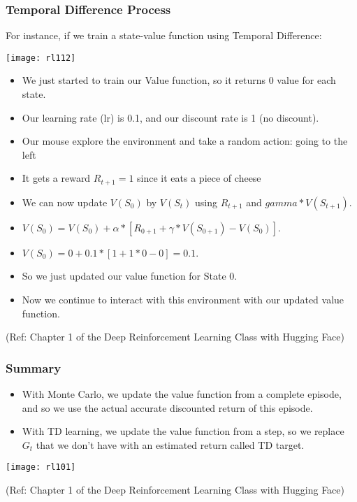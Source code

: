\begin{frame}[fragile]\frametitle{Temporal Difference Process}

For instance, if we train a state-value function using Temporal Difference:

\begin{center}
\texttt{[image: rl112]}
\end{center}


\begin{itemize}
\item We just started to train our Value function, so it returns 0 value for each state.
\item Our learning rate (lr) is 0.1, and our discount rate is 1 (no discount).
\item Our mouse explore the environment and take a random action: going to the left
\item It gets a reward $R_{t+1} = 1$ since it eats a piece of cheese
\item We can now update $V(S_0)$ by $V(S_t)$ using $R_{t+1}$ and $gamma * V(S_{t+1})$.
\item $V(S_0) = V(S_0) + \alpha * [R_{0+1} + \gamma * V(S_{0+1}) -V(S_0)] $.
\item $V(S_0) = 0 + 0.1 * [1 + 1 * 0 - 0] = 0.1$.
\item So we just updated our value function for State 0.
\item Now we continue to interact with this environment with our updated value function.
\end{itemize}


{\tiny (Ref: Chapter 1 of the Deep Reinforcement Learning Class with Hugging Face)}

\end{frame}



\begin{frame}[fragile]\frametitle{Summary}


\begin{itemize}
\item With Monte Carlo, we update the value function from a complete episode, and so we use the actual accurate discounted return of this episode.
\item With TD learning, we update the value function from a step, so we replace $G_t$ that we don't have with an estimated return called TD target.
\end{itemize}


\begin{center}
\texttt{[image: rl101]}
\end{center}



{\tiny (Ref: Chapter 1 of the Deep Reinforcement Learning Class with Hugging Face)}

\end{frame}


